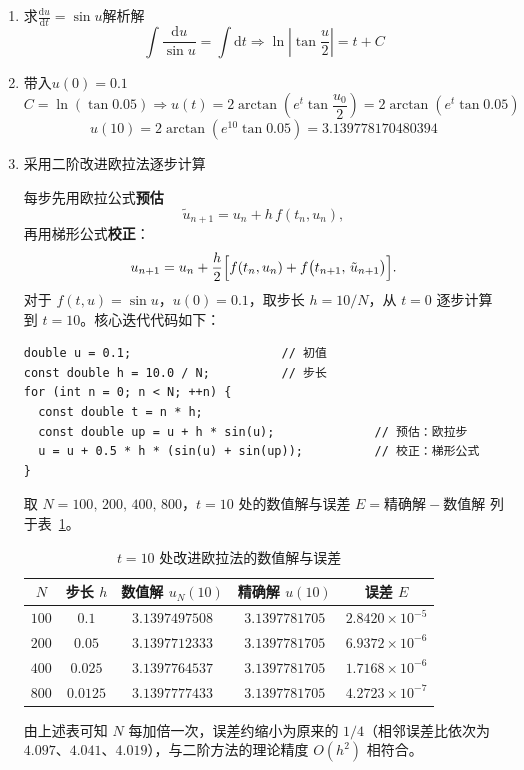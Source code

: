 \documentclass[UTF8, a4paper, 12pt]{ctexart}
\begin{document}
\begin{enumerate}
  \item 求$\frac{\mathrm{d} u}{\mathrm{d} t} = \sin {u}$解析解
    \[
      \int \frac{\mathrm{d}u}{\sin u} = \int \mathrm{d}t
      \Longrightarrow
      \ln\left|\tan\frac{u}{2}\right| = t + C
    \]

  \item 带入$u(0)=0.1$
    \[
      C = \ln{(\tan{0.05})}
      \Longrightarrow
      u(t)=2\arctan\left(e^{t}\tan\frac{u_{0}}{2}\right)=2\arctan\left(e^{t}\tan 0.05\right)
    \]
    \[
      u(10) = 2\arctan\left(e^{10}\tan 0.05\right) = 3.139778170480394
    \]
  
  \item 采用二阶改进欧拉法逐步计算

    每步先用欧拉公式\textbf{预估}
    \[
      \tilde{u}_{n+1} = u_n + h\,f(t_n,u_n),
    \]
    再用梯形公式\textbf{校正}：
    \[
      u_{n+1} = u_n + \frac{h}{2}\Bigl[f(t_n,u_n) + f\bigl(t_{n+1},\,\tilde{u}_{n+1}\bigr)\Bigr].
    \]
    对于 $f(t,u)=\sin u$，$u(0)=0.1$，取步长 $h=10/N$，从 $t=0$ 逐步计算到 $t=10$。核心迭代代码如下：

    \begin{lstlisting}
double u = 0.1;                     // 初值
const double h = 10.0 / N;          // 步长
for (int n = 0; n < N; ++n) {
  const double t = n * h;
  const double up = u + h * sin(u);              // 预估：欧拉步
  u = u + 0.5 * h * (sin(u) + sin(up));          // 校正：梯形公式
}
    \end{lstlisting}

    取 $N=100,\,200,\,400,\,800$，$t=10$ 处的数值解与误差 $E=\text{精确解}-\text{数值解}$ 列于表~\ref{tab:euler}。

    \begin{table}[htbp]
      \centering
      \caption{$t=10$ 处改进欧拉法的数值解与误差}
      \label{tab:euler}
      \begin{tabular}{ccccc}
        \toprule
        $N$ & 步长 $h$ & 数值解 $u_N(10)$ & 精确解 $u(10)$ & 误差 $E$ \\
        \midrule
        $100$ & $0.1$    & $3.1397497508$ & $3.1397781705$ & $2.8420\times 10^{-5}$ \\
        $200$ & $0.05$   & $3.1397712333$ & $3.1397781705$ & $6.9372\times 10^{-6}$ \\
        $400$ & $0.025$  & $3.1397764537$ & $3.1397781705$ & $1.7168\times 10^{-6}$ \\
        $800$ & $0.0125$ & $3.1397777433$ & $3.1397781705$ & $4.2723\times 10^{-7}$ \\
        \bottomrule
      \end{tabular}
    \end{table}

    由上述表可知 $N$ 每加倍一次，误差约缩小为原来的 $1/4$（相邻误差比依次为 $4.097$、$4.041$、$4.019$），与二阶方法的理论精度 $O(h^2)$ 相符合。
\end{enumerate}
\end{document}
